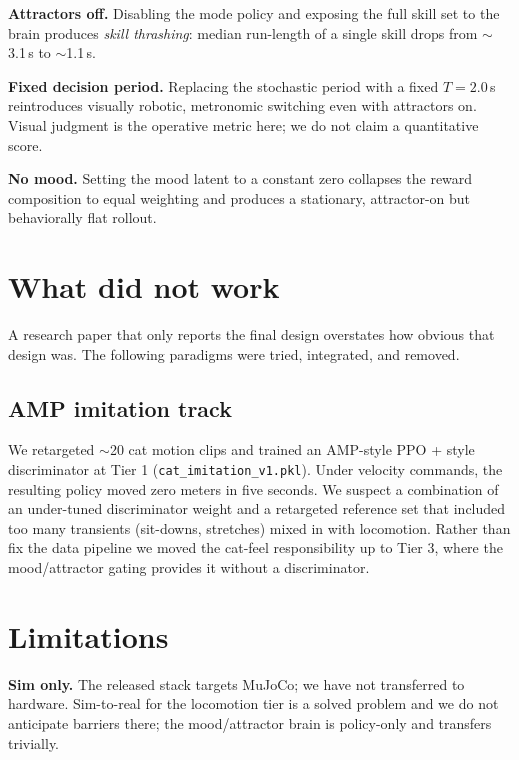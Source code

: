 \documentclass[11pt]{article}
\begin{document}
\textbf{Attractors off.} Disabling the mode policy and exposing the full
skill set to the brain produces \emph{skill thrashing}: median run-length
of a single skill drops from $\sim$3.1\,s to $\sim$1.1\,s.

\textbf{Fixed decision period.} Replacing the stochastic period with a
fixed $T = 2.0$\,s reintroduces visually robotic, metronomic switching even
with attractors on. Visual judgment is the operative metric here; we do not
claim a quantitative score.

\textbf{No mood.} Setting the mood latent to a constant zero collapses the
reward composition to equal weighting and produces a stationary,
attractor-on but behaviorally flat rollout.

\section{What did not work}
\label{sec:failed}

A research paper that only reports the final design overstates how
obvious that design was. The following paradigms were tried, integrated,
and removed.

\subsection{AMP imitation track}
\label{subsec:amp}

We retargeted $\sim$20 cat motion clips and trained an AMP-style PPO + style
discriminator at Tier 1 (\texttt{cat\_imitation\_v1.pkl}). Under velocity
commands, the resulting policy moved zero meters in five seconds. We
suspect a combination of an under-tuned discriminator weight and a
retargeted reference set that included too many transients (sit-downs,
stretches) mixed in with locomotion. Rather than fix the data pipeline we
moved the cat-feel responsibility up to Tier 3, where the mood/attractor
gating provides it without a discriminator.

\section{Limitations}

\textbf{Sim only.} The released stack targets MuJoCo; we have not transferred
to hardware. Sim-to-real for the locomotion tier is a solved problem
\cite{rudin2022parallel} and we do not anticipate barriers there; the
mood/attractor brain is policy-only and transfers trivially.
\end{document}
